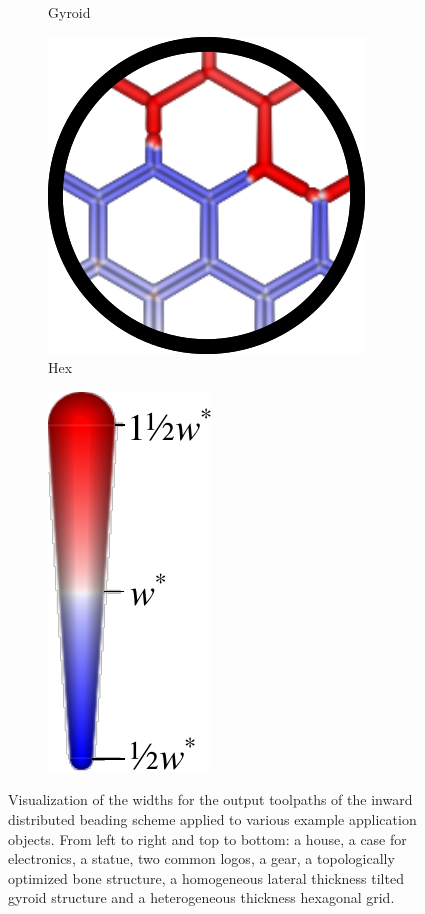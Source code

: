 \begin{figure}
\begin{subfigure}[t]{\figwidth}
\caption{Gyroid}\label{applications_gyroid}
\end{subfigure}
\begin{subfigure}[t]{\figwidth}\centering
\includegraphics[height=\figheight]{sources-applications-hex-grid.png}
\caption{Hex}\label{applications_hex}
\end{subfigure}
\begin{subfigure}[t]{.3\figwidth}
\includegraphics[height=\figheight]{sources-validation-widths-legend-small.pdf}
\end{subfigure}
\caption{
Visualization of the widths for the output toolpaths of the inward distributed beading scheme applied to various example application objects.
From left to right and top to bottom: a house, a case for electronics, a statue, two common logos, a gear, a topologically optimized bone structure, a homogeneous lateral thickness tilted gyroid structure and a heterogeneous thickness hexagonal grid.
}
\label{applications_overview}
\end{figure}




